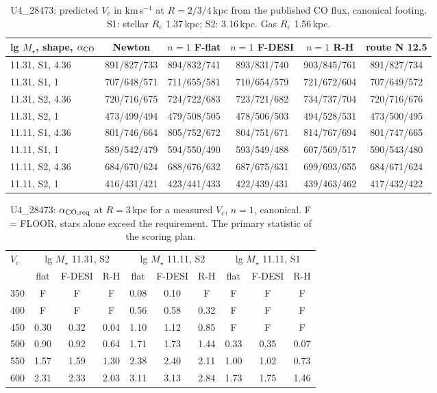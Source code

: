 \begin{table}[h]\centering\small\caption{U4\_28473: predicted $V_c$ in km\,s$^{-1}$ at $R=2/3/4$\,kpc from the published CO flux, canonical footing. S1: stellar $R_e$ 1.37\,kpc; S2: 3.16\,kpc. Gas $R_e$ 1.56\,kpc.}\label{t:fw}\begin{tabular}{lccccc}\toprule
lg $M_\star$, shape, $\alpha_{\rm CO}$ & Newton & $n{=}1$ F-flat & $n{=}1$ F-DESI & $n{=}1$ R-H & route N 12.5 \\ \midrule
11.31, S1, 4.36 & 891/827/733 & 894/832/741 & 893/831/740 & 903/845/761 & 891/827/734 \\
11.31, S1, 1 & 707/648/571 & 711/655/581 & 710/654/579 & 721/672/604 & 707/649/572 \\
11.31, S2, 4.36 & 720/716/675 & 724/722/683 & 723/721/682 & 734/737/704 & 720/716/676 \\
11.31, S2, 1 & 473/499/494 & 479/508/505 & 478/506/503 & 494/528/531 & 473/500/495 \\
11.11, S1, 4.36 & 801/746/664 & 805/752/672 & 804/751/671 & 814/767/694 & 801/747/665 \\
11.11, S1, 1 & 589/542/479 & 594/550/490 & 593/549/488 & 607/569/517 & 590/543/480 \\
11.11, S2, 4.36 & 684/670/624 & 688/676/632 & 687/675/631 & 699/693/655 & 684/671/624 \\
11.11, S2, 1 & 416/431/421 & 423/441/433 & 422/439/431 & 439/463/462 & 417/432/422 \\
\bottomrule\end{tabular}\end{table}
\begin{table}[h]\centering\small\caption{U4\_28473: $\alpha_{\rm CO,req}$ at $R=3$\,kpc for a measured $V_c$, $n=1$, canonical. F = FLOOR, stars alone exceed the requirement. The primary statistic of the scoring plan.}\label{t:inv}\begin{tabular}{lccccccccc}\toprule
$V_c$ & \multicolumn{3}{c}{lg $M_\star$ 11.31, S2} & \multicolumn{3}{c}{lg $M_\star$ 11.11, S2} & \multicolumn{3}{c}{lg $M_\star$ 11.11, S1} \\ & flat & F-DESI & R-H & flat & F-DESI & R-H & flat & F-DESI & R-H \\ \midrule
350 & F & F & F & 0.08 & 0.10 & F & F & F & F \\
400 & F & F & F & 0.56 & 0.58 & 0.32 & F & F & F \\
450 & 0.30 & 0.32 & 0.04 & 1.10 & 1.12 & 0.85 & F & F & F \\
500 & 0.90 & 0.92 & 0.64 & 1.71 & 1.73 & 1.44 & 0.33 & 0.35 & 0.07 \\
550 & 1.57 & 1.59 & 1.30 & 2.38 & 2.40 & 2.11 & 1.00 & 1.02 & 0.73 \\
600 & 2.31 & 2.33 & 2.03 & 3.11 & 3.13 & 2.84 & 1.73 & 1.75 & 1.46 \\
\bottomrule\end{tabular}\end{table}
